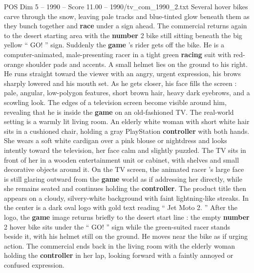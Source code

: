 \begin{textsample}{POS Dim 5 – 1990 – Score 11.00 – 1990/tv\_com\_1990\_2.txt}
Several hover bikes carve through the snow, leaving pale tracks and blue-tinted glow beneath them as they bunch together and \textbf{race} under a sign ahead.
The commercial returns again to the desert starting area with the \textbf{number} 2 bike still sitting beneath the big yellow “ GO! ” sign.
Suddenly the \textbf{game} ’s rider gets off the bike.
He is a computer-animated, male-presenting racer in a tight green \textbf{racing} suit with red-orange shoulder pads and accents.
A small helmet lies on the ground to his right.
He runs straight toward the viewer with an angry, urgent expression, his brows sharply lowered and his mouth set.
As he gets closer, his face fills the screen : pale, angular, low-polygon features, short brown hair, heavy dark eyebrows, and a scowling look.
The edges of a television screen become visible around him, revealing that he is inside the \textbf{game} on an old-fashioned TV.
The real-world setting is a warmly lit living room.
An elderly white woman with short white hair sits in a cushioned chair, holding a gray PlayStation \textbf{controller} with both hands.
She wears a soft white cardigan over a pink blouse or nightdress and looks intently toward the television, her face calm and slightly puzzled.
The TV sits in front of her in a wooden entertainment unit or cabinet, with shelves and small decorative objects around it.
On the TV screen, the animated racer ’s large face is still glaring outward from the \textbf{game} world as if addressing her directly, while she remains seated and continues holding the \textbf{controller}.
The product title then appears on a cloudy, silvery-white background with faint lightning-like streaks.
In the center is a dark oval logo with gold text reading “ Jet Moto 2. ” After the logo, the \textbf{game} image returns briefly to the desert start line : the empty \textbf{number} 2 hover bike sits under the “ GO! ” sign while the green-suited racer stands beside it, with his helmet still on the ground.
He moves near the bike as if urging action.
The commercial ends back in the living room with the elderly woman holding the \textbf{controller} in her lap, looking forward with a faintly annoyed or confused expression.

\end{textsample}
